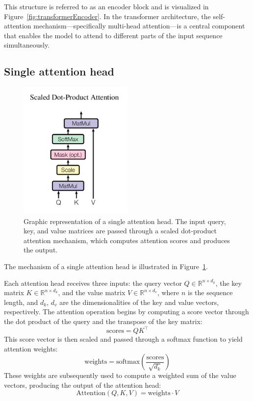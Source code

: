 \documentclass{pracalicmgr}
\begin{document}
This structure is referred to as an encoder block and is visualized in Figure~\ref{fig:transformerEncoder}. In the transformer architecture, the self-attention mechanism—specifically multi-head attention—is a central component that enables the model to attend to different parts of the input sequence simultaneously.

\subsection{Single attention head}

\begin{figure}[h]
    \centering
    \includegraphics[width=0.5\textwidth]{src/scaledDotProd.png}
    \caption{Graphic representation of a single attention head. The input query, key, and value matrices are passed through a scaled dot-product attention mechanism, which computes attention scores and produces the output.}
    \label{fig:singleAttentionHead}
\end{figure}

The mechanism of a single attention head is illustrated in Figure~\ref{fig:singleAttentionHead}.


Each attention head receives three inputs: the query vector \( Q \in \mathbb{R}^{n \times d_k} \), the key matrix \( K \in \mathbb{R}^{n \times d_k} \), and the value matrix \( V \in \mathbb{R}^{n \times d_v} \), where \( n \) is the sequence length, and \( d_k \), \( d_v \) are the dimensionalities of the key and value vectors, respectively. The attention operation begins by computing a score vector through the dot product of the query and the transpose of the key matrix:
\[
\text{scores} = QK^\top
\]
This score vector is then scaled and passed through a softmax function to yield attention weights:
\[
\text{weights} = \text{softmax}\left(\frac{\text{scores}}{\sqrt{d_k}}\right)
\]
These weights are subsequently used to compute a weighted sum of the value vectors, producing the output of the attention head:
\[
\text{Attention}(Q, K, V) = \text{weights} \cdot V
\]
\end{document}
